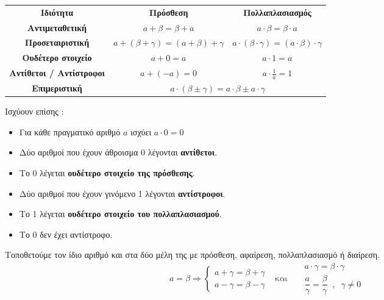 \documentclass[twoside,nofonts,internet,shmeiwseis]{thewria}
\begin{document}
\begin{enumerate}
\begin{center}
\begin{tabular}{ccc}
\hline \rule[-2ex]{0pt}{5.5ex} \textbf{Ιδιότητα} & \textbf{Πρόσθεση} & \textbf{Πολλαπλασιασμός} \\ 
\hhline{===} \rule[-2ex]{0pt}{5.5ex} \textbf{Αντιμεταθετική} & $ a+\beta=\beta+a $ & $ a\cdot\beta=\beta\cdot a $ \\
\rule[-2ex]{0pt}{5ex} \textbf{Προσεταιριστική} & $ a+\left( \beta+\gamma\right) =\left( a+\beta\right) +\gamma $ & $ a\cdot\left( \beta\cdot\gamma\right) =\left( a\cdot\beta\right)\cdot\gamma $\\
\rule[-2ex]{0pt}{5ex} \textbf{Ουδέτερο στοιχείο} & $ a+0=a $ & $ a\cdot1= a $\\
\rule[-2ex]{0pt}{5ex} \textbf{Αντίθετοι / Αντίστροφοι} & $ a+(-a)=0 $ & $ a\cdot\frac{1}{a}= 1 $\\
\rule[-2ex]{0pt}{5ex} \textbf{Επιμεριστική} & \multicolumn{2}{c}{$ a\cdot\left( \beta\pm\gamma\right)=a\cdot\beta\pm a\cdot\gamma  $}\\
\hline
\end{tabular}
\end{center}
Ισχύουν επίσης :
\begin{itemize}[itemsep=0mm]
\item Για κάθε πραγματικό αριθμό $ a $ ισχύει $ a\cdot0=0 $
\item Δύο αριθμοί που έχουν άθροισμα 0 λέγονται \textbf{αντίθετοι}.
\item Το 0 λέγεται \textbf{ουδέτερο στοιχείο της πρόσθεσης}.
\item Δύο αριθμοί που έχουν γινόμενο 1 λέγονται \textbf{αντίστροφοι}.
\item Το 1 λέγεται \textbf{ουδέτερο στοιχείο του πολλαπλασιασμού}.
\item Το 0 δεν έχει αντίστροφο.
\end{itemize}
\begin{rlist}
\item Τοποθετούμε τον ίδιο αριθμό και στα δύο μέλη της με πρόσθεση, αφαίρεση, πολλαπλασιασμό ή διαίρεση.
\[ a=\beta\Rightarrow
\begin{cases}
a+\gamma=\beta+\gamma\\a-\gamma=\beta-\gamma
\end{cases}\ \ \textrm{ και }\ \ \begin{aligned}
&a\cdot\gamma=\beta\cdot\gamma\\&\dfrac{a}{\gamma}=\dfrac{\beta}{\gamma}\;\;,\;\;\gamma\neq0
\end{aligned} \]

\end{rlist}
\end{enumerate}
\end{document}
